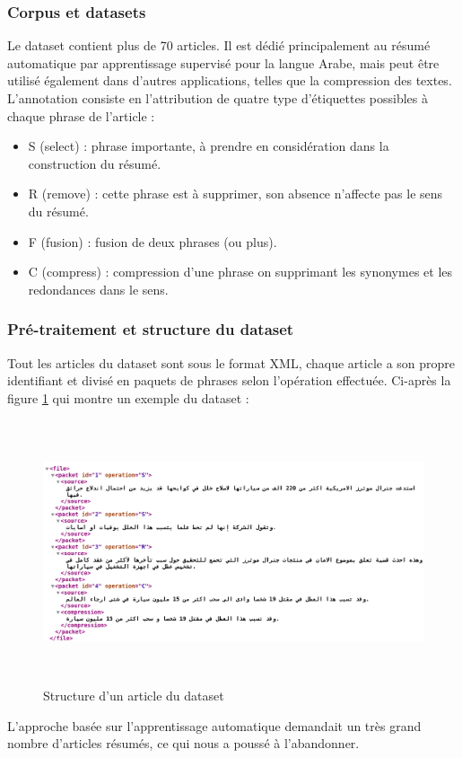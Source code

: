         \subsubsection{Corpus et datasets}
        Le dataset contient plus de 70 articles. Il est dédié principalement au résumé automatique par apprentissage supervisé pour la langue Arabe, mais peut être utilisé également dans d'autres applications, telles que la compression des textes.
        L'annotation consiste en l'attribution de quatre type d’étiquettes possibles à chaque phrase de l'article :
            \begin{itemize}
                \item S (select) : phrase importante, à prendre en considération dans la construction du résumé.
                \item R (remove) : cette phrase est à supprimer, son absence n'affecte pas le sens du résumé.
                \item F (fusion) : fusion de deux phrases (ou plus).
                \item C (compress) : compression d'une phrase on supprimant les synonymes et les redondances dans le sens.\\
            \end{itemize}

        \subsubsection{Pré-traitement et structure du dataset}
        Tout les articles du dataset sont sous le format XML, chaque article a son propre identifiant et divisé en paquets de phrases selon l'opération effectuée. Ci-après la figure \ref{xml-structure} qui montre un exemple du dataset : 
        \begin{figure}[H]
            \centering
            \includegraphics[height=220pt,width=430pt]{img/chapter4/xml.png}
            \caption{Structure d'un article du dataset}
            \label{xml-structure}
        \end{figure}
        L'approche basée sur l'apprentissage automatique demandait un très grand nombre d'articles résumés, ce qui nous a poussé à l'abandonner.

